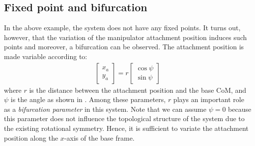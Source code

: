 \subsection{Fixed point and bifurcation}
\label{sec:ANALYSIS_FIXED}
In the above example, the system does not have any fixed points.
It turns out, however, that the variation of the manipulator attachment position
induces such points and moreover, a bifurcation can be observed.
The attachment position is made variable according to:
%
\begin{align}
  \begin{bmatrix}
    x_{a}\\
    y_{a}
  \end{bmatrix}
  =
  r
  \begin{bmatrix}
    \cos\psi\\
    \sin\psi
  \end{bmatrix}
\end{align}
%
where %
$r$ is the distance between the attachment position and the base CoM,
and $\psi$ is the angle as shown in .
Among these parameters, $r$ plays an important role as a \textit{bifurcation parameter} in this system.
Note that we can assume $\psi = 0$ because this parameter does not influence the topological structure
of the system due to the existing rotational symmetry. Hence, it is sufficient to variate 
the attachment position along the $x$-axis of the base frame.

